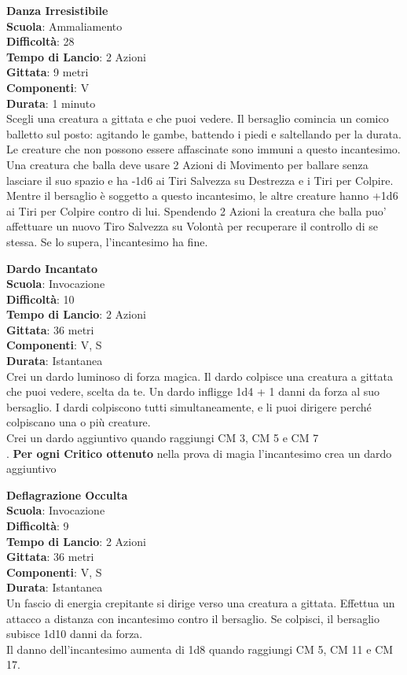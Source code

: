 \begin{multicols}{2}
\medskip\textbf{Danza Irresistibile}\\
\textbf{Scuola}: Ammaliamento\\
\textbf{Difficoltà}: 28\\
\textbf{Tempo di Lancio}: 2 Azioni\\
\textbf{Gittata}: 9 metri\\
\textbf{Componenti}: V\\
\textbf{Durata}: 1 minuto\\
Scegli una creatura a gittata e che puoi vedere. Il bersaglio comincia un comico balletto sul posto: agitando le gambe, battendo i piedi e saltellando per la durata. Le creature che non possono essere affascinate sono immuni a questo incantesimo.\\
Una creatura che balla deve usare 2 Azioni di Movimento per ballare senza lasciare il suo spazio e ha -1d6 ai Tiri Salvezza su Destrezza e i Tiri per Colpire. Mentre il bersaglio è soggetto a questo incantesimo, le altre creature hanno +1d6 ai Tiri per Colpire contro di lui. Spendendo 2 Azioni la creatura che balla puo' affettuare un nuovo Tiro Salvezza su Volontà per recuperare il controllo di se stessa. Se lo supera, l'incantesimo ha fine.

\medskip\textbf{Dardo Incantato}\\
\textbf{Scuola}: Invocazione\\
\textbf{Difficoltà}: 10\\
\textbf{Tempo di Lancio}: 2 Azioni\\
\textbf{Gittata}: 36 metri\\
\textbf{Componenti}: V, S\\
\textbf{Durata}: Istantanea\\
Crei un dardo luminoso di forza magica. Il dardo colpisce una creatura a gittata che puoi vedere, scelta da te. Un dardo infligge 1d4 + 1 danni da forza al suo bersaglio. I dardi colpiscono tutti simultaneamente, e li puoi dirigere perché colpiscano una o più creature.\\
Crei un dardo aggiuntivo quando raggiungi CM 3, CM 5 e CM 7\\.
\textbf{Per ogni Critico ottenuto} nella prova di magia l'incantesimo crea un dardo aggiuntivo

\medskip\textbf{Deflagrazione Occulta}\\
\textbf{Scuola}: Invocazione\\
\textbf{Difficoltà}: 9\\
\textbf{Tempo di Lancio}: 2 Azioni\\
\textbf{Gittata}: 36 metri\\
\textbf{Componenti}: V, S\\
\textbf{Durata}: Istantanea\\
Un fascio di energia crepitante si dirige verso una creatura a gittata. Effettua un attacco a distanza con incantesimo contro il bersaglio. Se colpisci, il bersaglio subisce 1d10 danni da forza.\\
Il danno dell'incantesimo aumenta di 1d8 quando raggiungi CM 5, CM 11 e CM 17.


\end{multicols}
